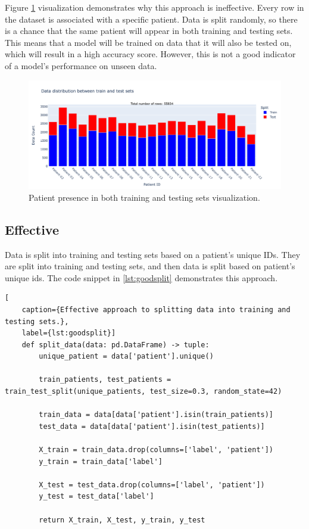                     Figure \ref{fig:badsplit} visualization demonstrates why this approach is ineffective. Every row in the dataset is associated with a specific patient. Data is split randomly, so there is a chance that the same patient will appear in both training and testing sets. This means that a model will be trained on data that it will also be tested on, which will result in a high accuracy score. However, this is not a good indicator of a model's performance on unseen data.

                    \begin{figure}[H]
                        \centering
                        \includegraphics[width=1.0\textwidth]{../src/resources/plots/splits/bad.png}
                        \caption{
                            Patient presence in both training and testing sets visualization.
                        }
                        \label{fig:badsplit}
                    \end{figure}
        
                    \newpage

            \subsection{Effective} \label{sec:goodsplit}
            Data is split into training and testing sets based on a patient's unique IDs. They are split into training and testing sets, and then data is split based on patient's unique ids. The code snippet in \ref{lst:goodsplit} demonstrates this approach.

\begin{lstlisting}[
    caption={Effective approach to splitting data into training and testing sets.}, 
    label={lst:goodsplit}]
    def split_data(data: pd.DataFrame) -> tuple:    
        unique_patient = data['patient'].unique()

        train_patients, test_patients = train_test_split(unique_patients, test_size=0.3, random_state=42)

        train_data = data[data['patient'].isin(train_patients)]
        test_data = data[data['patient'].isin(test_patients)] 

        X_train = train_data.drop(columns=['label', 'patient'])
        y_train = train_data['label']

        X_test = test_data.drop(columns=['label', 'patient'])
        y_test = test_data['label']
        
        return X_train, X_test, y_train, y_test
\end{lstlisting}

